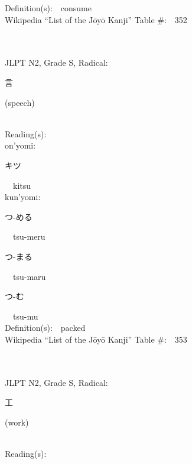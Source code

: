 \begin{multicols}{2}
Definition(s):\ \ consume \\
Wikipedia ``List of the J\=oy\=o Kanji'' Table \#:\ \ 352 \\
\ \ \\
{\fontsize{34pt}{40pt}  }\ \ \\  %
{JLPT N2, Grade S, Radical:\ \ {\begin{CJK}{UTF8}{min} 言 \end{CJK}} (speech) } \\
Reading(s):\ \ \\
{\hspace*{1em}}on'yomi:\ \ \\
{\hspace*{2em}}{\begin{CJK}{UTF8}{min} キツ \end{CJK}}\ \ kitsu\ \ \\
{\hspace*{1em}}kun'yomi:\ \ \\
{\hspace*{2em}}{\begin{CJK}{UTF8}{min} つ-める \end{CJK}}\ \ tsu-meru\ \ \\
{\hspace*{2em}}{\begin{CJK}{UTF8}{min} つ-まる \end{CJK}}\ \ tsu-maru\ \ \\
{\hspace*{2em}}{\begin{CJK}{UTF8}{min} つ-む \end{CJK}}\ \ tsu-mu\ \ \\
Definition(s):\ \ packed \\
Wikipedia ``List of the J\=oy\=o Kanji'' Table \#:\ \ 353 \\
\ \ \\
{\fontsize{34pt}{40pt}  }\ \ \\  %
{JLPT N2, Grade S, Radical:\ \ {\begin{CJK}{UTF8}{min} 工 \end{CJK}} (work) } \\
Reading(s):\ \ \\

\end{multicols}
